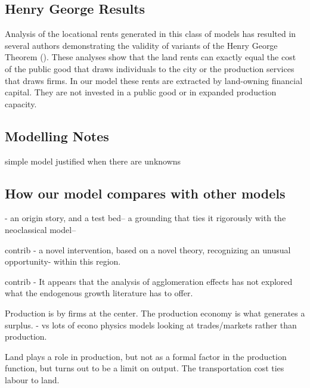 \subsection{Henry George Results}
Analysis of the locational rents generated in this class of models has resulted in several authors demonstrating the validity of variants of the Henry George Theorem (\cite{Arnott-Stiglitz79, Arnott04, BehrensKanemoto14, JohnM.Hartwick1980THGR}). These analyses  show that the land rents can exactly equal the cost of the public good that draws individuals to the city or the production services that draws firms. In our model these rents are extracted by land-owning financial capital. They are not invested in a public good or in expanded production capacity.

\subsection{Modelling Notes}


simple model justified when there are unknowns %

\subsection{How our model compares with other models}

- an origin story, and a test bed-- a grounding that ties it rigorously with the neoclassical model-- 


contrib - a novel intervention, based on a novel theory, recognizing an unusual opportunity- within this region.

contrib - It appears that the analysis of  agglomeration effects has not explored what the endogenous growth literature has to offer.

Production is by firms at the center. The production economy is what generates a surplus.  %
- vs lots of econo physics models looking at trades/markets rather than production.

Land plays a role in production, but not as a formal factor in the production function, but turns out to be a limit on output. The transportation cost ties labour to land. 

